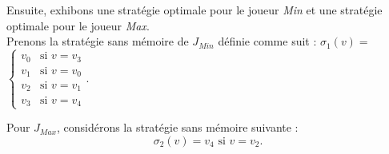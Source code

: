 \begin{exemple}
Ensuite, exhibons une stratégie optimale pour le joueur \textit{Min} et une stratégie optimale pour le joueur \textit{Max}.\\

\noindent Prenons la stratégie sans mémoire de $J_{Min}$ définie comme suit : $\sigma _{1}(v) = $ $\begin{cases}
																						v_{0} & \text{si }v = v_{3}\\
																						v_{1} & \text{si }v = v_{0}\\
																						v_{2} & \text{si }v = v_{1}\\
																						v_{3} & \text{si }v = v_{4}
																					\end{cases}.$

\noindent Pour $J_{Max}$, considérons la stratégie sans mémoire suivante :$$\sigma _{2}(v) = v_{4}  \text{ si } v = v_{2}.$$\\
																																										
						
\end{exemple}
